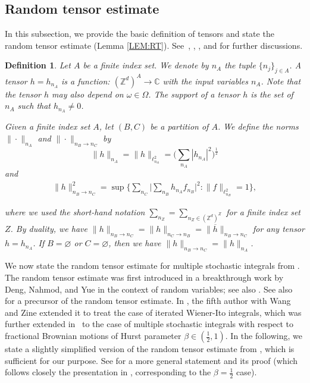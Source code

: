 \documentclass[letterpaper, 11pt,  reqno]{amsart}
\newtheorem{definition}[theorem]{Definition}
\newcommand{\1}{\hspace{0.5mm}\textup{I}\hspace{0.5mm}}
\newcommand{\noi}{\noindent}
\newcommand{\Z}{\mathbb{Z}}
\newcommand{\be}{\beta}
\newcommand{\cj}{\overline}
\renewcommand{\l}{\ell}
\renewcommand{\o}{\omega}
\newcommand{\Om}{\Omega}
\numberwithin{equation}{section}
\numberwithin{theorem}{section}
\begin{document}
\subsection{Random tensor estimate}
\label{SUBSEC:RT}




In this subsection, we provide the basic definition of tensors and 
state the random tensor estimate (Lemma \ref{LEM:RT}).
See~\cite[Sections 2 and 4]{DNY3}, \cite[Section~4]{Bring}, 
\cite[Appendix C]{OWZ}, 
and \cite[Section 2]{OW3}
for further discussions.

\begin{definition} \label{DEF:tensor} \rm
Let $A$ be a finite index set. We denote by $n_A$ the tuple $ \{n_j \}_{j \in A}$. 
 A tensor $h = h_{n_A}$ is a function: $(\Z^d)^{A} \to \mathbb{C} $ with the input variables $n_A$. Note that the tensor $h$ may also depend on $\o \in \Om$. 
 The support of a tensor $h$ is the set of $n_A$ such that $h_{n_A} \neq 0$. 

Given a finite index set  $A$, 
let $(B, C)$ be a partition of $A$. We define the norms 
 $\| \cdot \|_{n_A}$ and 
$\| \cdot \|_{n_{B} \to n_{C}}$ by 
\[ \| h \|_{n_A}  = \|h\|_{\l^2_{n_A}} = \bigg(\sum_{n_A} |h_{n_A}|^2\bigg)^\frac{1}{2}\]
and
\begin{align*}
  \| h \|^2_{n_{B} \to n_{C}} = \sup \bigg\{ 
\sum_{n_{C}} \Big| \sum_{n_{B}} h_{n_A} f_{n_{B}} \Big|^2 :  \| f \|_{\l^2_{n_{B}}} =1  \bigg\},  
\end{align*}


\noi
where  we used the short-hand notation $\sum_{n_Z} = \sum_{n_Z \in (\Z^d)^Z}$ for a finite index set $Z$.
By duality, we have  $\| h \|_{n_{B} \to n_{C}} = \| h \|_{n_{C} \to n_{B}} 
= \| \cj h \|_{n_{B} \to n_{C}}$ for any tensor $h = h_{n_A}$. 
If $B = \varnothing$ or $C = \varnothing$,  then we have
$  \| h \|_{n_{B} \to n_{C}} = \| h \|_{n_A}$.
\end{definition}






We  now state the random tensor estimate
for multiple stochastic integrals
from \cite{CLO2, COZ}.
The random tensor estimate 
was first introduced 
in a breakthrough work \cite{DNY3}
by Deng, Nahmod, and Yue 
in the context of random variables;
see also 
\cite{Bring, OW3}.
See also  \cite{BO96} for a precursor of
the random tensor estimate.
In \cite{OWZ}, 
the fifth author with Wang and Zine
extended it 
to treat the case of iterated Wiener-Ito integrals, 
which was further extended
in~\cite{CLO2, COZ}
to the case of 
multiple stochastic integrals
with respect to fractional Brownian motions of Hurst parameter $\be\in(\frac12, 1)$.
In the following, we state a slightly simplified
version of the random tensor estimate from \cite{CLO2},
which is sufficient for our purpose.
See \cite{CLO2}
for a more general statement and its proof
(which follows closely the presentation in \cite{OWZ}, 
corresponding to the $\be = \frac 12$ case).
\end{document}
